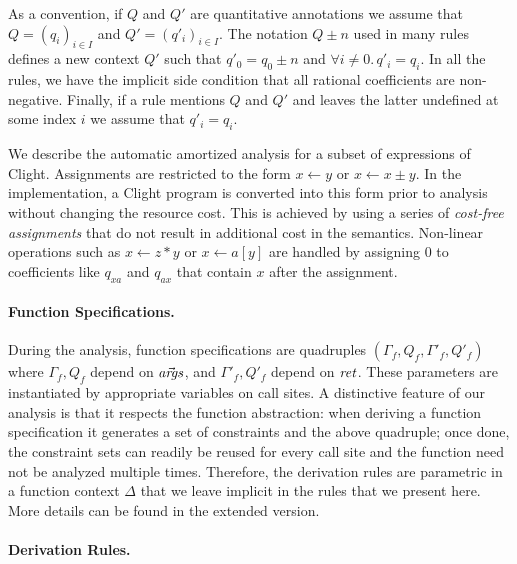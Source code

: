 \documentclass[nocopyrightspace,preprint,pldi]{sigplanconf-pldi15}
\newcommand{\ifshort}[2]{\ifx\fullversion\undefined{#1}\else{#2}\fi}
\newcommand{\paraskip}[0]{\ifshort{\vspace{-2pt}}{}}
\begin{document}
As a convention, if $Q$ and $Q'$ are quantitative annotations
we assume that $Q = (q_i)_{i\in I}$ and $Q' = (q'_i)_{i \in I}$.
The notation $Q \pm n$ used in many rules defines a new context $Q'$
such that $q'_0 = q_0 \pm n$ and $\forall i \neq 0 .\, q'_i = q_i$.
In all the rules, we have the implicit side condition that all rational
coefficients are non-negative.  Finally, if a rule mentions $Q$ and $Q'$
and leaves the latter undefined at some index $i$ we assume that $q'_i = q_i$.

We describe the automatic amortized analysis for a subset of
expressions of Clight.  Assignments are restricted to the form $x \gets
y$ or $x \gets x \pm y$.  In the implementation, a Clight
program is converted into this form prior to analysis without changing
the resource cost.  This is achieved by using a series of \emph{cost-free
  assignments} that do not result in additional cost in the
semantics.  Non-linear operations such as $x \gets z*y$ or $x \gets
a[y]$ are handled by assigning $0$ to coefficients
like $q_{xa}$ and $q_{ax}$ that contain $x$ after the assignment.

\paraskip
\paragraph{Function Specifications.}

During the analysis, function specifications are quadruples
$(\Gamma_f, Q_f, \Gamma'_f, Q'_f)$ where $\Gamma_f, Q_f$ depend on
${\vec {\mathit{args}}}$, and $\Gamma'_f, Q'_f$ depend on ${\mathit{ret}}$.  These parameters
are instantiated by appropriate variables on call sites.  A distinctive
feature of our analysis is that it respects the function abstraction:
when deriving a function specification it generates a set of
constraints and the above quadruple; once done, the constraint
sets can readily be reused for every call site and the function need
not be analyzed multiple times.
%
Therefore, the derivation rules are parametric in a function context $\Delta$
that we leave implicit in the rules that we present here. More details
can be found in the extended version.

\paraskip
\paragraph{Derivation Rules.}
\end{document}
